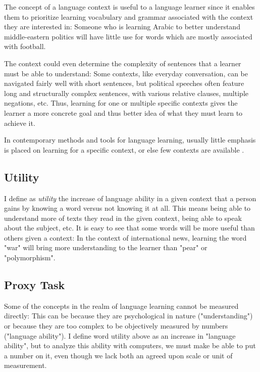 The concept of a language context is useful to a language learner since it enables them to prioritize learning vocabulary and grammar associated with the context they are interested in:
Someone who is learning Arabic to better understand middle-eastern politics will have little use for words which are mostly associated with football.

The context could even determine the complexity of sentences that a learner must be able to understand:
Some contexts, like everyday conversation, can be navigated fairly well with short sentences, but political speeches often feature long and structurally complex sentences, with various relative clauses, multiple negations, etc.
Thus, learning for one or multiple specific contexts gives the learner a more concrete goal and thus better idea of what they must learn to achieve it.

In contemporary methods and tools for language learning, usually little emphasis is placed on learning for a specific context, or else few contexts are available .

\subsection{Utility}
I define as \textit{utility} the increase of language ability in a given context that a person gains by knowing a word versus not knowing it at all.
This means being able to understand more of texts they read in the given context, being able to speak about the subject, etc.
It is easy to see that some words will be more useful than others given a context:
In the context of international news, learning the word "war" will bring more understanding to the learner than "pear" or "polymorphism".

\subsection{Proxy Task}
Some of the concepts in the realm of language learning cannot be measured directly:
This can be because they are psychological in nature ("understanding") or because they are too complex to be objectively measured by numbers ("language ability").
I define word utility above as an increase in "language ability", but to analyze this ability with computers, we must make be able to put a number on it, even though we lack both an agreed upon scale or unit of measurement.

